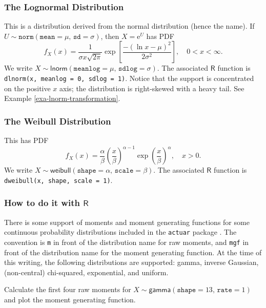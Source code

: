 \subsubsection{The Lognormal Distribution}
\label{sec-6-5-3-4}

This is a distribution derived from the normal distribution (hence the
name). If
\(U\sim\mathtt{norm}(\mathtt{mean}=\mu,\,\mathtt{sd}=\sigma)\), then
\( X = \mathrm{e}^{U} \) has PDF
\begin{equation}
f_{X}(x)=\frac{1}{\sigma x\sqrt{2\pi}}\exp\left[\frac{-(\ln x-\mu)^{2}}{2\sigma^{2}}\right], \quad 0 < x < \infty.
\end{equation}
We write
\(X\sim\mathsf{lnorm}(\mathtt{meanlog}=\mu,\,\mathtt{sdlog}=\sigma)\). The
associated \(\mathsf{R}\) function is \texttt{dlnorm(x, meanlog = 0, sdlog =
1)}. Notice that the support is concentrated on the positive \(x\)
axis; the distribution is right-skewed with a heavy tail. See Example
\ref{exa-lnorm-transformation}.

\subsubsection{The Weibull Distribution}
\label{sec-6-5-3-5}

This has PDF
\begin{equation}
f_{X}(x)=\frac{\alpha}{\beta}\left(\frac{x}{\beta}\right)^{\alpha-1}\exp\left(\frac{x}{\beta}\right)^{\alpha},\quad x>0.
\end{equation}
We write
\(X\sim\mathsf{weibull}(\mathtt{shape}=\alpha,\,\mathtt{scale}=\beta)\). The
associated \(\mathsf{R}\) function is \texttt{dweibull(x, shape, scale = 1)}.

\subsubsection{How to do it with \(\mathsf{R}\)}
\label{sec-6-5-3-6}

There is some support of moments and moment generating functions for
some continuous probability distributions included in the \texttt{actuar}
package \cite{actuar}. The convention is \texttt{m} in front of the
distribution name for raw moments, and \texttt{mgf} in front of the
distribution name for the moment generating function. At the time of
this writing, the following distributions are supported: gamma,
inverse Gaussian, (non-central) chi-squared, exponential, and uniform.


Calculate the first four raw moments for
\(X\sim\mathsf{gamma}(\mathtt{shape}=13,\,\mathtt{rate}=1)\) and plot
the moment generating function.

